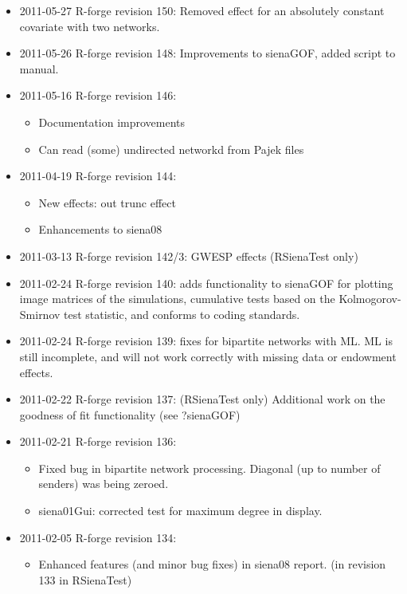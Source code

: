 \documentclass[a4paper,fleqn,11pt]{article}
\newcommand{\+}{\, + \,}
\begin{document}
{\begin{small}
\begin{itemize}
\begin{itemize}
\item Bayesian routine (still very much under development) has altered.
\end{itemize}
\item 2011-05-27 R-forge revision 150: Removed effect for an absolutely constant
  covariate with two networks.
\item 2011-05-26 R-forge revision 148:
Improvements to sienaGOF, added script to manual.
\item 2011-05-16 R-forge revision 146:
\begin{itemize}
\item Documentation improvements
\item Can read (some) undirected networkd from Pajek files
\end{itemize}
\item 2011-04-19 R-forge revision 144:
\begin{itemize}
\item New effects: out trunc effect
\item Enhancements to siena08
\end{itemize}
\item 2011-03-13 R-forge revision 142/3: GWESP effects (RSienaTest only)
\item 2011-02-24 R-forge revision 140: adds functionality to sienaGOF
  for plotting
  image matrices of the simulations, cumulative tests based on the Kolmogorov-
  Smirnov test statistic, and conforms to coding standards.
\item 2011-02-24 R-forge revision 139: fixes for bipartite networks with
  ML. ML is still incomplete, and will not work correctly with missing data or
  endowment effects.
\item 2011-02-22 R-forge revision 137: (RSienaTest only)
Additional work on the goodness of fit functionality (see ?sienaGOF)
\item 2011-02-21 R-forge revision 136:
\begin{itemize}
\item Fixed bug in bipartite network processing. Diagonal (up to number of
  senders) was being zeroed.
\item siena01Gui: corrected test for maximum degree in display.
\end{itemize}
\item 2011-02-05 R-forge revision 134:
\begin{itemize}
\item Enhanced features (and minor bug fixes) in siena08 report. (in revision
  133 in RSienaTest)

\end{itemize}
\end{itemize}
\end{small}}
\end{document}
